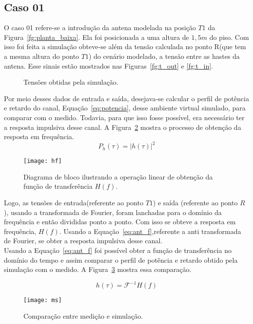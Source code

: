 \subsection{Caso 01}
O caso 01 refere-se a introdução da antena modelada na posição $T1$ da Figura~\ref{fg:planta_baixa}. Ela foi posicionada a uma altura de $1,5m$ do piso. Com isso foi feita a simulação obteve-se além da tensão calculada no ponto R(que tem a mesma altura do ponto $T1$) do cenário modelado, a tensão entre as hastes da antena. Esse sinais estão mostrados nas Figuras~\ref{fg:t_out} e \ref{fg:t_in}.

\begin{figure}[!ht]
	\begin{center}
\qquad
	\end{center}
	\caption{Tensões obtidas pela simulação.}
	\label{fg:tensoes}
\end{figure}

Por meio desses dados de entrada e saída, desejava-se calcular o perfil de potência e retardo do canal, Equação~\ref{eq:potencia}, desse ambiente virtual simulado, para comparar com o medido. Todavia, para que isso fosse possível, era necessário ter a resposta impulsiva desse canal. A Figura~\ref{fg:hf} mostra o processo de obtenção da resposta em frequência.\\

\begin{equation}\label{eq:potencia}
	P_h(\tau) = |h(\tau)|^{2}
\end{equation}
\begin{figure}[!ht]
	\centering
	\texttt{[image: hf]}
	\caption{Diagrama de bloco ilustrando a operação linear de obtenção da função de transferência $H(f)$.}
	\label{fg:hf}
\end{figure}

Logo, as tensões de entrada(referente ao ponto $T1$) e saída (referente ao ponto $R$), usando a transformada de Fourier, foram lanchadas para o domínio da frequência e então divididas ponto a ponto. Com isso se obteve a resposta em frequência, $H( f )$. Usando a Equação~\ref{eq:ant_f},referente a anti transformada de Fourier, se obter a resposta impulsiva desse canal.\\


Usando a Equação~\ref{eq:ant_f} foi possível obter a função de transferência no domínio do tempo e assim comparar o perfil de potência e retardo obtido pela simulação com o medido. A Figura~\ref{fg:ms} mostra essa comparação.

\begin{equation}\label{eq:ant_f}
	h(\tau) = \mathcal{F}^{-1}{H(f)}
\end{equation}

\begin{figure}[!ht]
	\centering
	\texttt{[image: ms]}
	\caption{Comparação entre medição e simulação.}
	\label{fg:ms}
\end{figure}
